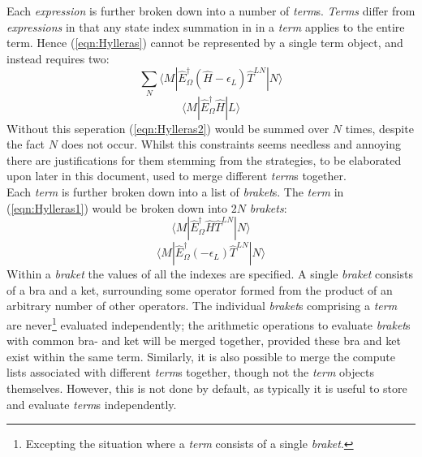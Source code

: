 \documentclass[12pt]{article}
\begin{document}
\noindent Each \emph{expression} is further broken down into a number of \emph{term}s.
\emph{Terms} differ from \emph{expressions} in that any state index summation in
in a \emph{term} applies to the entire term.
Hence (\ref{eqn:Hylleras}) cannot be represented by a single term object, and instead
requires two:
\begin{equation}
\sum_{N} 
\langle M | \hat{E}^{\dagger}_{\Omega} (\hat{H}-\epsilon_{L}) \hat{T}^{LN} | N \rangle  
\label{eqn:Hylleras1}
\end{equation}
\begin{equation}
\langle M | \hat{E}^{\dagger}_{\Omega} \hat{H} | L  \rangle  
\label{eqn:Hylleras2}
\end{equation}
\noindent Without this seperation (\ref{eqn:Hylleras2}) would be summed over $N$ times,
despite the fact $N$ does not occur. 
Whilst this constraints seems needless and annoying there are justifications for them stemming
from the strategies, to be elaborated upon later in this document, used to merge different \emph{term}s together. \\ 

\noindent Each \emph{term} is further broken down into a list of \emph{braket}s. The \emph{term} 
in (\ref{eqn:Hylleras1}) would be broken down into $2N$ \emph{brakets}: 
\begin{equation}
\langle M | \hat{E}^{\dagger}_{\Omega} \hat{H} \hat{T}^{LN} | N \rangle  
\end{equation}
\begin{equation}
\langle M | \hat{E}^{\dagger}_{\Omega} (-\epsilon_{L}) \hat{T}^{LN} | N \rangle  
\end{equation}
\noindent Within a \emph{braket} the values of all the indexes are specified.
A single \emph{braket} consists of a bra and a ket, surrounding some operator
formed from the product of an arbitrary number of other operators.  The
individual \emph{braket}s comprising a \emph{term} are never\footnote{Excepting
the situation where a \emph{term} consists of a single \emph{braket}.}
evaluated independently; the arithmetic operations to evaluate \emph{braket}s
with common bra- and ket will be merged together, provided these bra and ket
exist within the same term. Similarly, it is also possible to merge the compute
lists associated with different \emph{term}s together, though not the
\emph{term} objects themselves. However, this is not done by default, as
typically it is useful to store and evaluate \emph{term}s independently.\\
\end{document}
